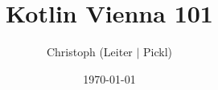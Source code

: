 \documentclass{beamer}
\begin{document}
\title{Kotlin Vienna 101}   
\author{Christoph (Leiter $\vert$ Pickl)} 
\date{\today} 


\frame{\titlepage} 




\end{document}
